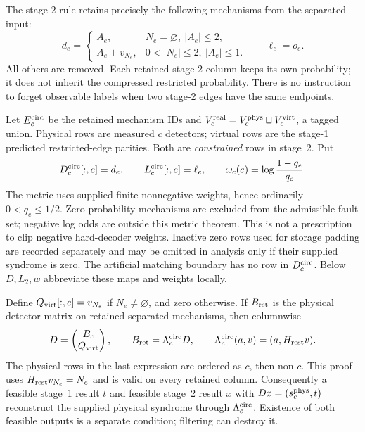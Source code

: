The stage-2 rule retains precisely the following mechanisms from the
separated input:
\begin{equation}
 d_e=\begin{cases}
 A_e,&N_e=\varnothing,\ |A_e|\le2,\\
 A_e+v_{N_e},&0<|N_e|\le2,\ |A_e|\le1.
 \end{cases}
 \qquad \ell_e=o_e .                         \label{eq:cl-decomp}
\end{equation}
All others are removed. Each retained stage-2 column keeps its own
probability; it does not inherit the compressed restricted probability.
There is no instruction to forget observable labels when two stage-2
edges have the same endpoints.

\begin{definition}\label{def:cl-stage2}
Let $E_c^{\rm circ}$ be the retained mechanism IDs and
$V_c^{\rm real}=V_c^{\rm phys}\sqcup V_c^{\rm virt}$, a tagged union.
Physical rows are measured $c$ detectors; virtual rows are the stage-1
predicted restricted-edge parities. Both are \emph{constrained} rows in
stage~2. Put
\[
 D_c^{\rm circ}[:,e]=d_e,\qquad L_c^{\rm circ}[:,e]=\ell_e,
 \qquad \omega_c(e)=\log\frac{1-q_e}{q_e}.
\]
The metric uses supplied finite nonnegative weights, hence ordinarily
$0<q_e\le1/2$. Zero-probability mechanisms are excluded from the admissible
fault set; negative log odds are outside this metric theorem. This is
not a prescription to clip negative hard-decoder weights.
Inactive zero rows used for storage padding are recorded separately and
may be omitted in analysis only if their supplied syndrome is zero.
The artificial matching boundary has no row in $D_c^{\rm circ}$.
Below $D,L_2,w$ abbreviate these maps and weights locally.
\end{definition}

Define $Q_{\rm virt}[:,e]=v_{N_e}$ if $N_e\ne\varnothing$, and zero
otherwise. If $B_{\rm ret}$ is the physical detector matrix on retained
separated mechanisms, then columnwise
\begin{equation}
 D=\begin{pmatrix}B_c\\Q_{\rm virt}\end{pmatrix},\qquad
 B_{\rm ret}=\Lambda_c^{\rm circ}D,\qquad
 \Lambda_c^{\rm circ}(a,v)=(a,H_{\rm rest}v).
 \label{eq:cl-factor}
\end{equation}
The physical rows in the last expression are ordered as $c$, then non-$c$.
This proof uses $H_{\rm rest}v_{N_e}=N_e$ and is valid on every retained
column. Consequently a feasible stage~1 result $t$ and feasible stage~2
result $x$ with $Dx=(s_c^{\rm phys},t)$ reconstruct the supplied physical
syndrome through $\Lambda_c^{\rm circ}$. Existence of both feasible outputs
is a separate condition; filtering can destroy it.

